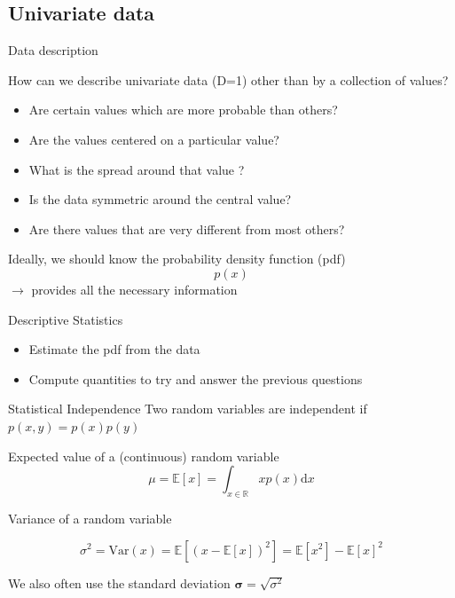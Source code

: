 \documentclass{beamer}
\begin{document}
\subsection{Univariate data}

\begin{frame}{Data description}



How can we describe univariate data (D=1) other than by a collection of values?\\

\begin{itemize}
\item Are certain values which are more probable than others?
\item Are the values centered on a particular value?
\item What is the spread around that value ?
\item Is the data symmetric around the central value?
\item Are there values that are very different from most others?
\end{itemize}

\vspace{0.25cm}
Ideally, we should know the probability density function (pdf)
\begin{equation*}
p(x)
\end{equation*}
$\rightarrow$ provides all the necessary information

\end{frame}

\begin{frame}{Descriptive Statistics}

\begin{itemize}
\item Estimate the pdf from the data
\item Compute quantities to try and answer the previous questions
\end{itemize}


\begin{block}{Statistical Independence}
Two random variables are independent if $p(x,y) = p(x)p(y)$
\end{block}

\begin{block}{Expected value of a (continuous) random variable}
\begin{equation*}
\mu = \mathbb{E}[x] = \int_{x \in \mathbb{R}} x p(x) \textrm{d}x
\end{equation*}

\end{block}

\begin{block}{Variance of a random variable}

\begin{equation*}
\sigma^2 = \textrm{Var}(x) = \mathbb{E}[(x-\mathbb{E}[x])^2] =  \mathbb{E}[x^2]-\mathbb{E}[x]^2
\end{equation*}
\end{block}

We also often use the standard deviation $\mathbf{\sigma} = \sqrt{\sigma^{2}}$

\end{frame}
\end{document}
